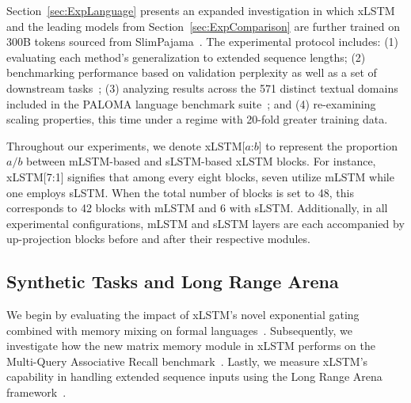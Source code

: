 Section~\ref{sec:ExpLanguage} presents an expanded investigation in which xLSTM and the leading models from Section~\ref{sec:ExpComparison} are further trained on 300B tokens sourced from SlimPajama~\citep{Soboleva:23}. The experimental protocol includes: (1) evaluating each method’s generalization to extended sequence lengths; (2) benchmarking performance based on validation perplexity as well as a set of downstream tasks~\citep{Sutawika:24}; (3) analyzing results across the 571 distinct textual domains included in the PALOMA language benchmark suite~\citep{Magnusson:23arxivshort}; and (4) re-examining scaling properties, this time under a regime with 20-fold greater training data.

Throughout our experiments, we denote xLSTM[$a$:$b$] to represent the proportion $a/b$ between mLSTM-based and sLSTM-based xLSTM blocks. For instance, xLSTM[7:1] signifies that among every eight blocks, seven utilize mLSTM while one employs sLSTM. When the total number of blocks is set to 48, this corresponds to 42 blocks with mLSTM and 6 with sLSTM. Additionally, in all experimental configurations, mLSTM and sLSTM layers are each accompanied by up-projection blocks before and after their respective modules.

\subsection{Synthetic Tasks and Long Range Arena}
\label{sec:ExpSyntethic}
We begin by evaluating the impact of xLSTM's novel exponential gating combined with memory mixing on formal languages~\citep{Deletang:23}. Subsequently, we investigate how the new matrix memory module in xLSTM performs on the Multi-Query Associative Recall benchmark~\citep{Arora:23arxiv}. Lastly, we measure xLSTM's capability in handling extended sequence inputs using the Long Range Arena framework~\citep{Tay:21}.

